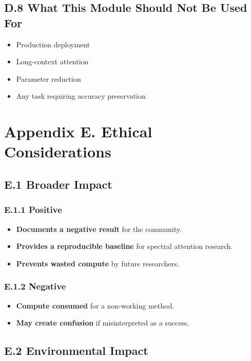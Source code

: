 \subsection{D.8 What This Module Should Not Be Used For}

\begin{itemize}
\item Production deployment
\item Long-context attention
\item Parameter reduction
\item Any task requiring accuracy preservation

\end{itemize}



\section{Appendix E. Ethical Considerations}

\subsection{E.1 Broader Impact}

\subsubsection{E.1.1 Positive}

\begin{itemize}
\item \textbf{Documents a negative result} for the community.
\item \textbf{Provides a reproducible baseline} for spectral attention research.
\item \textbf{Prevents wasted compute} by future researchers.

\end{itemize}
\subsubsection{E.1.2 Negative}

\begin{itemize}
\item \textbf{Compute consumed} for a non-working method.
\item \textbf{May create confusion} if misinterpreted as a success.

\end{itemize}
\subsection{E.2 Environmental Impact}

